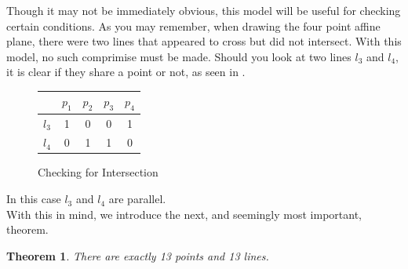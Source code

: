 \documentclass{article}
\newtheorem{theorem}{Theorem}[section]
\begin{document}
Though it may not be immediately obvious, this model will be useful for checking certain conditions. As you may remember, when drawing the four point affine plane, there were two lines that appeared to cross but did not intersect. With this model, no such comprimise must be made. Should you look at two lines $l_3$ and $l_4$, it is clear if they share a point or not, as seen in .
\begin{figure}[h]
\caption{Checking for Intersection}
\begin{center}
\begin{tabular}{ c|c|c|c|c } 
 
  & $p_1$ & $p_2$ & $p_3$ &$p_4$\\ 
 \hline
 $l_3$ & 1 & 0 & 0 & 1\\
 \hline
 $l_4$ & 0 & 1 & 1 & 0\\
\end{tabular}
\end{center}
\end{figure}
 In this case $l_3$ and $l_4$ are parallel. \\
 
 With this in mind, we introduce the next, and seemingly most important, theorem.
 \begin{theorem}
 There are exactly 13 points and 13 lines.
 \end{theorem}
 
\end{document}
